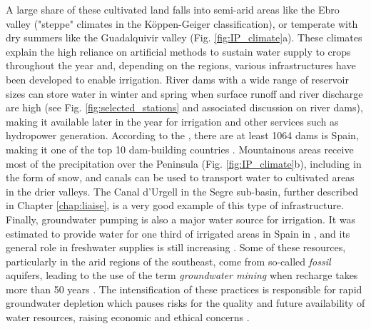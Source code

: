 A large share of these cultivated land falls into semi-arid areas like the Ebro valley ("steppe" climates in the Köppen-Geiger classification), or temperate with dry summers like the Guadalquivir valley (Fig. \ref{fig:IP_climate}a). These climates explain the high reliance on artificial methods to sustain water supply to crops throughout the year and, depending on the regions, various infrastructures have been developed to enable irrigation. 
River dams with a wide range of reservoir sizes can store water in winter and spring when surface runoff and river discharge are high (see Fig. \ref{fig:selected_stations} and associated discussion on river dams), making it available later in the year for irrigation and other services such as hydropower generation.
According to the \citet{ICOLD2020}, there are at least 1064 dams is Spain, making it one of the top 10 dam-building countries \citep{sadki_implementation_2023}.
Mountainous areas receive most of the precipitation over the Peninsula (Fig. \ref{fig:IP_climate}b), including in the form of snow, and canals can be used to transport water to cultivated areas in the drier valleys. The Canal d'Urgell \citep{farran_urgell_2024} in the Segre sub-basin, further described in Chapter \ref{chap:liaise}, is a very good example of this type of infrastructure.
Finally, groundwater pumping is also a major water source for irrigation. It was estimated to provide water for one third of irrigated areas in Spain in \citet{de_stefano_groundwater_2015}, and its general role in freshwater supplies is still increasing \citep{llamas_groundwater_2015}. Some of these resources, particularly in the arid regions of the southeast, come from so-called \textit{fossil} aquifers, leading to the use of the term \textit{groundwater mining} when recharge takes more than 50 years \citep{custodio_groundwater_2016}.
The intensification of these practices is responsible for rapid groundwater depletion which pauses risks for the quality and future availability of water resources, raising economic and ethical concerns \citep{custodio_groundwater_2017}.

